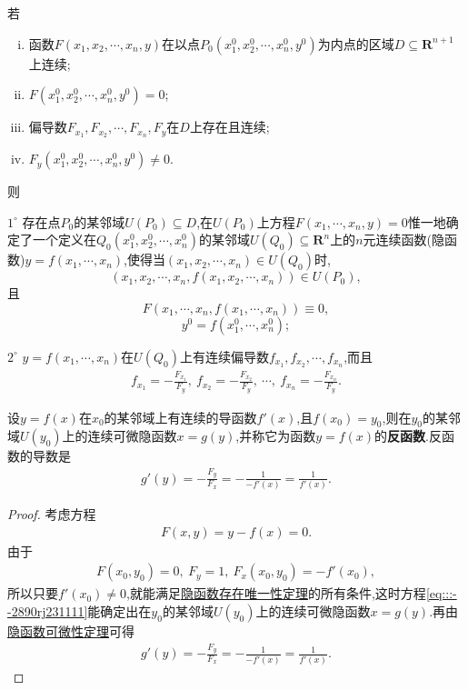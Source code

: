 \documentclass[../../main.tex]{subfiles}%
\begin{document}
\begin{theorem}
若
\begin{enumerate}[(i)]
\item 函数$F(x_1,x_2,\cdots,x_n,y)$在以点$P_0(x_1^0,x_2^0,\cdots,x_n^0,y^0)$为内点的区域$D \subseteq \mathbf{R}^{n+1}$上连续;
\item $F(x_1^0,x_2^0,\cdots,x_n^0,y^0) = 0$;
\item 偏导数$F_{x_1},F_{x_2},\cdots,F_{x_n},F_y$在$D$上存在且连续;
\item $F_y(x_1^0,x_2^0,\cdots,x_n^0,y^0) \neq 0$.
\end{enumerate}
则

$1^\circ$ 存在点$P_0$的某邻域$U(P_0) \subseteq D$,在$U(P_0)$上方程$F(x_1,\cdots,x_n,y) = 0$惟一地确定了一个定义在$Q_0(x_1^0,x_2^0,\cdots,x_n^0)$的某邻域$U(Q_0) \subseteq \mathbf{R}^n$上的$n$元连续函数(隐函数)$y = f(x_1,\cdots,x_n)$,使得当$(x_1,x_2,\cdots,x_n) \in U(Q_0)$时,
\[
(x_1,x_2,\cdots,x_n,f(x_1,x_2,\cdots,x_n)) \in U(P_0),
\]
且
\[
F(x_1,\cdots,x_n,f(x_1,\cdots,x_n)) \equiv 0,
\]
\[
y^0 = f(x_1^0,\cdots,x_n^0);
\]

$2^\circ$ $y = f(x_1,\cdots,x_n)$在$U(Q_0)$上有连续偏导数$f_{x_1},f_{x_2},\cdots,f_{x_n}$,而且
\begin{align*}
f_{x_1} = -\frac{F_{x_1}}{F_y},\ f_{x_2} = -\frac{F_{x_2}}{F_y},\ \cdots,\ f_{x_n} = -\frac{F_{x_n}}{F_y}.
\end{align*}
\end{theorem}

\begin{theorem}[反函数的存在性及其导数]
设$y = f(x)$在$x_0$的某邻域上有连续的导函数$f'(x)$,且$f(x_0) = y_0$,则在$y_0$的某邻域$U(y_0)$上的连续可微隐函数$x = g(y)$,并称它为函数$y = f(x)$的\textbf{反函数}.反函数的导数是
\begin{align*}
g'(y) = -\frac{F_y}{F_x} = -\frac{1}{-f'(x)} = \frac{1}{f'(x)}. 
\end{align*}
\end{theorem}
\begin{proof}
考虑方程
\begin{align}
F(x,y) = y - f(x) = 0. \label{eq:::--2890rj231111}
\end{align}
由于
\begin{align*}
F(x_0,y_0) = 0,\ F_y = 1,\ F_x(x_0,y_0) = -f'(x_0),
\end{align*}
所以只要$f'(x_0) \neq 0$,就能满足\hyperref[theorem:隐函数存在唯一性定理]{隐函数存在唯一性定理}的所有条件,这时方程\eqref{eq:::--2890rj231111}能确定出在$y_0$的某邻域$U(y_0)$上的连续可微隐函数$x = g(y)$.再由\hyperref[theorem:隐函数可微性定理]{隐函数可微性定理}可得
\begin{align*}
g'(y) = -\frac{F_y}{F_x} = -\frac{1}{-f'(x)} = \frac{1}{f'(x)}. 
\end{align*}
\end{proof}
\end{document}
